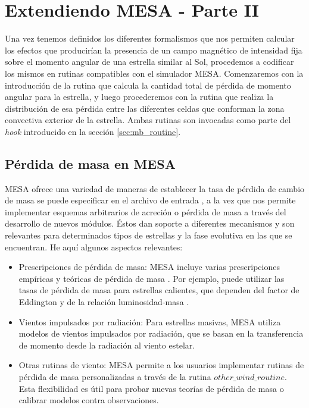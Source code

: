 \section{Extendiendo MESA - Parte II}
Una vez tenemos definidos los diferentes formalismos que nos permiten calcular los efectos que producirían la presencia de un campo magnético de intensidad fija sobre el momento angular de una estrella similar al Sol, procedemos a codificar los mismos en rutinas compatibles con el simulador MESA. Comenzaremos con la introducción de la rutina que calcula la cantidad total de pérdida de momento angular para la estrella, y luego procederemos con la rutina que realiza la distribución de esa pérdida entre las diferentes celdas que conforman la zona convectiva exterior de la estrella. Ambas rutinas son invocadas como parte del \textit{hook} introducido en la sección \ref{sec:mb_routine}. \par

\subsection{Pérdida de masa en MESA}
MESA ofrece una variedad de maneras de establecer la tasa de pérdida de cambio de masa se puede especificar en el archivo de entrada \cite{Paxton2010}, a la vez que nos permite implementar esquemas arbitrarios de acreción o pérdida de masa a través del desarrollo de nuevos módulos. Éstos dan soporte a diferentes mecanismos y son relevantes para determinados tipos de estrellas y la fase evolutiva en las que se encuentran. He aquí algunos aspectos relevantes:
\begin{itemize}
    \item Prescripciones de pérdida de masa: MESA incluye varias prescripciones empíricas y teóricas de pérdida de masa \cite{Vink2023}. Por ejemplo, puede utilizar las tasas de pérdida de masa para estrellas calientes, que dependen del factor de Eddington y de la relación luminosidad-masa \cite{Gautham2022}.
    \item Vientos impulsados por radiación: Para estrellas masivas, MESA utiliza modelos de vientos impulsados por radiación, que se basan en la transferencia de momento desde la radiación al viento estelar.
    \item Otras rutinas de viento: MESA permite a los usuarios implementar rutinas de pérdida de masa personalizadas a través de la rutina $other\_wind\_routine$. Esta flexibilidad es útil para probar nuevas teorías de pérdida de masa o calibrar modelos contra observaciones.
\end{itemize}

